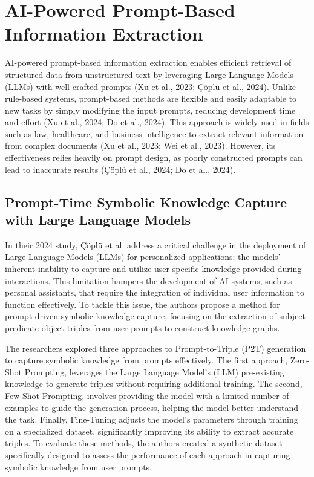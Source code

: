 \section{AI-Powered Prompt-Based Information Extraction}

AI-powered prompt-based information extraction enables efficient retrieval of structured data from unstructured text by leveraging Large Language Models (LLMs) with well-crafted prompts (Xu et al., 2023; Çöplü et al., 2024). Unlike rule-based systems, prompt-based methods are flexible and easily adaptable to new tasks by simply modifying the input prompts, reducing development time and effort (Xu et al., 2024; Do et al., 2024). This approach is widely used in fields such as law, healthcare, and business intelligence to extract relevant information from complex documents (Xu et al., 2023; Wei et al., 2023). However, its effectiveness relies heavily on prompt design, as poorly constructed prompts can lead to inaccurate results (Çöplü et al., 2024; Do et al., 2024).

\subsection{Prompt-Time Symbolic Knowledge Capture with Large Language Models}

In their 2024 study, Çöplü et al. address a critical challenge in the deployment of Large Language Models (LLMs) for personalized applications: the models' inherent inability to capture and utilize user-specific knowledge provided during interactions. This limitation hampers the development of AI systems, such as personal assistants, that require the integration of individual user information to function effectively. To tackle this issue, the authors propose a method for prompt-driven symbolic knowledge capture, focusing on the extraction of subject-predicate-object triples from user prompts to construct knowledge graphs.

The researchers explored three approaches to Prompt-to-Triple (P2T) generation to capture symbolic knowledge from prompts effectively. The first approach, Zero-Shot Prompting, leverages the Large Language Model's (LLM) pre-existing knowledge to generate triples without requiring additional training. The second, Few-Shot Prompting, involves providing the model with a limited number of examples to guide the generation process, helping the model better understand the task. Finally, Fine-Tuning adjusts the model's parameters through training on a specialized dataset, significantly improving its ability to extract accurate triples. To evaluate these methods, the authors created a synthetic dataset specifically designed to assess the performance of each approach in capturing symbolic knowledge from user prompts.

